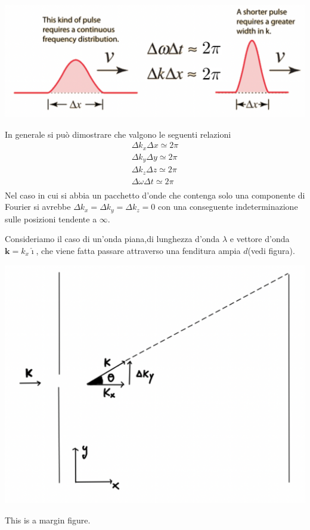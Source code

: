 \begin{marginfigure}
	\includegraphics{figs/rel-indet}
	\label{fig:rel-indet}
\end{marginfigure}

In generale si può dimostrare che valgono le seguenti relazioni \begin{gather*}
	\Delta k_{x} \Delta x \simeq2 \pi\\
	\Delta k_{y} \Delta y \simeq2 \pi\\
	\Delta k_{z} \Delta z \simeq2 \pi\\
	\Delta \omega \Delta t \simeq2 \pi\\
\end{gather*} Nel caso in cui si abbia un pacchetto d'onde che contenga solo una
componente di Fourier si avrebbe
\(\Delta k_{x} = \Delta k_{y} = \Delta k_{z} = 0\) con una conseguente
indeterminazione sulle posizioni tendente a \(\infty\).

Consideriamo il caso di un'onda piana,di lunghezza d'onda \(\lambda\) e
vettore d'onda \(\bm{k} = k_x \hat{\imath}\), che viene fatta passare
attraverso una fenditura ampia \(d\)(vedi figura).

\begin{marginfigure}
	\includegraphics{figs/wave-electron-experiment}
	\caption{This is a margin figure.}
	\label{fig:wave-electron-experiment}
\end{marginfigure}

